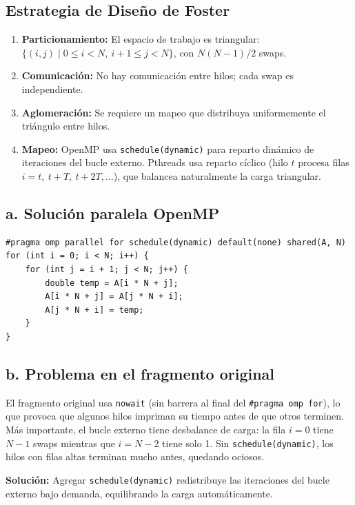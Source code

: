 \documentclass[11pt,a4paper]{article}
\begin{document}
\subsection*{Estrategia de Diseño de Foster}
\begin{enumerate}
    \item \textbf{Particionamiento:} El espacio de trabajo es triangular: $\{(i,j) \mid 0 \le i < N,\ i+1 \le j < N\}$, con $N(N-1)/2$ swaps.
    \item \textbf{Comunicación:} No hay comunicación entre hilos; cada swap es independiente.
    \item \textbf{Aglomeración:} Se requiere un mapeo que distribuya uniformemente el triángulo entre hilos.
    \item \textbf{Mapeo:} OpenMP usa \texttt{schedule(dynamic)} para reparto dinámico de iteraciones del bucle externo. Pthreads usa reparto cíclico (hilo $t$ procesa filas $i = t,\ t+T,\ t+2T,\ldots$), que balancea naturalmente la carga triangular.
\end{enumerate}

\subsection*{a. Solución paralela OpenMP}

\begin{lstlisting}
#pragma omp parallel for schedule(dynamic) default(none) shared(A, N)
for (int i = 0; i < N; i++) {
    for (int j = i + 1; j < N; j++) {
        double temp = A[i * N + j];
        A[i * N + j] = A[j * N + i];
        A[j * N + i] = temp;
    }
}
\end{lstlisting}

\subsection*{b. Problema en el fragmento original}
El fragmento original usa \texttt{nowait} (sin barrera al final del \texttt{\#pragma omp for}), lo que provoca que algunos hilos impriman su tiempo antes de que otros terminen. Más importante, el bucle externo tiene desbalance de carga: la fila $i=0$ tiene $N-1$ swaps mientras que $i=N-2$ tiene solo 1. Sin \texttt{schedule(dynamic)}, los hilos con filas altas terminan mucho antes, quedando ociosos.

\textbf{Solución:} Agregar \texttt{schedule(dynamic)} redistribuye las iteraciones del bucle externo bajo demanda, equilibrando la carga automáticamente.
\end{document}
